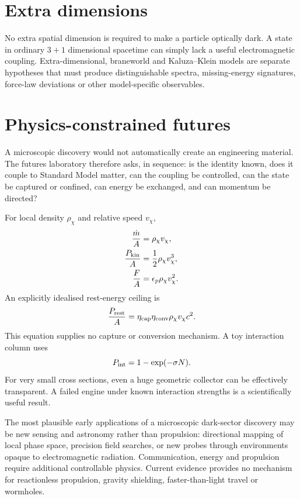 \documentclass[11pt,a4paper]{article}
\begin{document}
\section{Extra dimensions}
No extra spatial dimension is required to make a particle optically dark. A state in ordinary $3+1$ dimensional spacetime can simply lack a useful electromagnetic coupling. Extra-dimensional, braneworld and Kaluza--Klein models are separate hypotheses that must produce distinguishable spectra, missing-energy signatures, force-law deviations or other model-specific observables.

\section{Physics-constrained futures}
A microscopic discovery would not automatically create an engineering material. The futures laboratory therefore asks, in sequence: is the identity known, does it couple to Standard Model matter, can the coupling be controlled, can the state be captured or confined, can energy be exchanged, and can momentum be directed?

For local density $\rho_\chi$ and relative speed $v_\chi$,
\begin{align}
\frac{\dot m}{A}&=\rho_\chi v_\chi,\\
\frac{P_{\rm kin}}{A}&=\frac{1}{2}\rho_\chi v_\chi^3,\\
\frac{F}{A}&=\epsilon_p\rho_\chi v_\chi^2.
\end{align}
An explicitly idealised rest-energy ceiling is
\begin{equation}
\frac{P_{\rm rest}}{A}=\eta_{\rm cap}\eta_{\rm conv}\rho_\chi v_\chi c^2.
\end{equation}
This equation supplies no capture or conversion mechanism. A toy interaction column uses
\begin{equation}
P_{\rm int}=1-\exp(-\sigma N).
\end{equation}
For very small cross sections, even a huge geometric collector can be effectively transparent. A failed engine under known interaction strengths is a scientifically useful result.

The most plausible early applications of a microscopic dark-sector discovery may be new sensing and astronomy rather than propulsion: directional mapping of local phase space, precision field searches, or new probes through environments opaque to electromagnetic radiation. Communication, energy and propulsion require additional controllable physics. Current evidence provides no mechanism for reactionless propulsion, gravity shielding, faster-than-light travel or wormholes.
\end{document}
